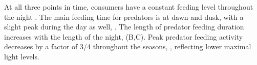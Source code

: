 At all three points in time, consumers have a constant feeding level throughout the night . The main feeding time for predators is at dawn and dusk, with a slight peak during the day as well, . The length of predator feeding duration increases with the length of the night,  (B,C). Peak predator feeding activity decreases by a factor of 3/4 throughout the seasons, , reflecting lower maximal light levels.


